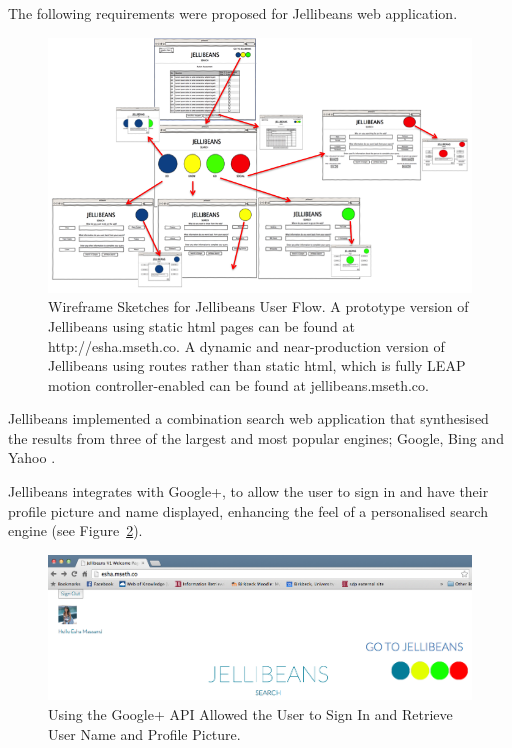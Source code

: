 \documentclass[a4paper, 11pt]{article}
\begin{document}
The following requirements were proposed for Jellibeans web application. 

\begin{figure}[H]
\begin{center}
\includegraphics[scale=0.65]{JellibeanUserFlow.png}
\end{center}
\caption{Wireframe Sketches for Jellibeans User Flow. A prototype version of Jellibeans using static html pages can be found at http://esha.mseth.co. A dynamic and near-production version of Jellibeans using routes rather than static html, which is fully LEAP motion controller-enabled can be found at jellibeans.mseth.co. }
\label{JBeanUserFlow}
\end{figure}

\vspace{5mm}
Jellibeans implemented a combination search web application that synthesised the results from three of the largest and most popular engines; Google, Bing and Yahoo \cite{adam}.

\vspace{5mm}

Jellibeans integrates with Google+, to allow the user to sign in and have their profile picture and name displayed, enhancing the feel of a personalised search engine (see Figure~\ref{googlesignin}).

\begin{figure}[H]
\begin{center}
\includegraphics[scale=0.25]{helloEsha}
\end{center}
\caption{Using the Google+ API Allowed the User to Sign In and Retrieve User Name and Profile Picture.}
\label{googlesignin}
\end{figure}
\end{document}
